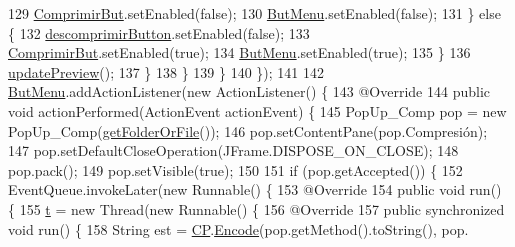 \begin{DoxyCode}
129                             \hyperlink{classpresentacion_1_1form_1_1mainForm_a8a68ad38dda26d35d37dccec4fa9338d}{ComprimirBut}.setEnabled(\textcolor{keyword}{false});
130                             \hyperlink{classpresentacion_1_1form_1_1mainForm_aef69e0291d6680e935cf1161971b3b29}{ButMenu}.setEnabled(\textcolor{keyword}{false});
131                         \} \textcolor{keywordflow}{else} \{
132                             \hyperlink{classpresentacion_1_1form_1_1mainForm_a336e6855f8a19241d02376d4ff6a1802}{descomprimirButton}.setEnabled(\textcolor{keyword}{false});
133                             \hyperlink{classpresentacion_1_1form_1_1mainForm_a8a68ad38dda26d35d37dccec4fa9338d}{ComprimirBut}.setEnabled(\textcolor{keyword}{true});
134                             \hyperlink{classpresentacion_1_1form_1_1mainForm_aef69e0291d6680e935cf1161971b3b29}{ButMenu}.setEnabled(\textcolor{keyword}{true});
135                         \}
136                         \hyperlink{classpresentacion_1_1form_1_1mainForm_aa71c48a8ef6eb2b3913dd665e5439538}{updatePreview}();
137                     \}
138                 \}
139             \}
140         \});
141 
142         \hyperlink{classpresentacion_1_1form_1_1mainForm_aef69e0291d6680e935cf1161971b3b29}{ButMenu}.addActionListener(\textcolor{keyword}{new} ActionListener() \{
143             @Override
144             \textcolor{keyword}{public} \textcolor{keywordtype}{void} actionPerformed(ActionEvent actionEvent) \{
145                 PopUp\_Comp pop = \textcolor{keyword}{new} PopUp\_Comp(\hyperlink{classpresentacion_1_1form_1_1mainForm_af6d62b4914fbc44469a3c173e0472c43}{getFolderOrFile}());
146                 pop.setContentPane(pop.Compresión);
147                 pop.setDefaultCloseOperation(JFrame.DISPOSE\_ON\_CLOSE);
148                 pop.pack();
149                 pop.setVisible(\textcolor{keyword}{true});
150 
151                 \textcolor{keywordflow}{if} (pop.getAccepted()) \{
152                     EventQueue.invokeLater(\textcolor{keyword}{new} Runnable() \{
153                         @Override
154                         \textcolor{keyword}{public} \textcolor{keywordtype}{void} run() \{
155                             \hyperlink{classpresentacion_1_1form_1_1mainForm_a4643a7a227b8b65874d63d33a5adfc33}{t} = \textcolor{keyword}{new} Thread(\textcolor{keyword}{new} Runnable() \{
156                                 @Override
157                                 \textcolor{keyword}{public} \textcolor{keyword}{synchronized} \textcolor{keywordtype}{void} run() \{
158                                     String est = \hyperlink{classpresentacion_1_1form_1_1mainForm_a4d01396f002d4f9bd18db3877057c77b}{CP}.\hyperlink{classpresentacion_1_1Ctrl__Presentacio_1_1Ctrl__Presentacio_a83ea715afbbe389c6f1fb68f29121205}{Encode}(pop.getMethod().toString(), pop.

\end{DoxyCode}
